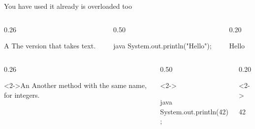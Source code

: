 \documentclass[\deckoptions]{beamer}
\begin{document}
\begin{frame}[fragile]{You have used it already}{ is overloaded too}
  \begin{boxrow}
  \begin{columns}[c, onlytextwidth]
    \begin{column}{0.26\textwidth}
      \begin{card}{A }
        The version that takes text.
      \end{card}
    \end{column}
    \begin{column}{0.50\textwidth}
\begin{codeblock}{java}
System.out.println("Hello");
\end{codeblock}
    \end{column}
    \begin{column}{0.20\textwidth}
\begin{console}
Hello
\end{console}
    \end{column}
  \end{columns}
  \end{boxrow}
  \boxrowgap
  \begin{boxrow}
  \begin{columns}[c, onlytextwidth]
    \begin{column}{0.26\textwidth}
      \begin{card}<2->{An }
        Another method with the same name, for integers.
      \end{card}
    \end{column}
    \begin{column}{0.50\textwidth}
      \begin{uncoverenv}<2->
\begin{codeblock}{java}
System.out.println(42);
\end{codeblock}
      \end{uncoverenv}
    \end{column}
    \begin{column}{0.20\textwidth}
      \begin{uncoverenv}<2->
\begin{console}
42
\end{console}
      \end{uncoverenv}
    \end{column}
  \end{columns}

\end{boxrow}
\end{frame}
\end{document}

